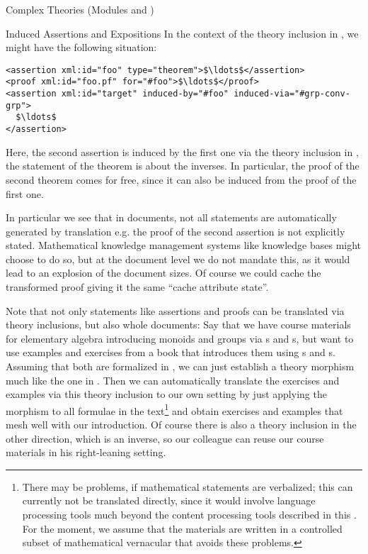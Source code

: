 \begin{tchapter}[id=complex-theories,short=Complex Theories]{Complex Theories (Modules
    {} and {})}
\begin{tsection}[id=induced-assertions,short=Induced Assertions]{Induced Assertions and Expositions}
  In the context of the theory inclusion in {}, we
  might have the following situation:
\begin{lstlisting}[label=lst:assertion-translation,mathescape,
  caption={Translating a Statement via a Theory Inclusion},
  index={translated-from,translated-via}]
<assertion xml:id="foo" type="theorem">$\ldots$</assertion>
<proof xml:id="foo.pf" for="#foo">$\ldots$</proof>
<assertion xml:id="target" induced-by="#foo" induced-via="#grp-conv-grp"> 
  $\ldots$
</assertion>
\end{lstlisting}
Here, the second assertion is induced by the first one via the theory inclusion in
{}, the statement of the theorem is about the inverses.  In
particular, the proof of the second theorem comes for free, since it can also be induced
from the proof of the first one.

In particular we see that in {\omdoc} documents, not all statements are automatically
generated by translation e.g. the proof of the second assertion is not explicitly stated.
Mathematical knowledge management systems like knowledge bases might choose to do so, but
at the document level we do not mandate this, as it would lead to an explosion of the
document sizes. Of course we could cache the transformed proof giving it the same ``cache
attribute state''.

Note that not only statements like assertions and proofs can be translated via theory
inclusions, but also whole documents: Say that we have course materials for elementary
algebra introducing monoids and groups via {s} and
{s}, but want to use examples and exercises from a book that
introduces them using {s} and {s}. Assuming
that both are formalized in {\omdoc}, we can just establish a theory morphism much like
the one in {}. Then we can automatically translate the
exercises and examples via this theory inclusion to our own setting by just applying the
morphism to all formulae in the text\footnote{There may be problems, if mathematical
  statements are verbalized; this can currently not be translated directly, since it would
  involve language processing tools much beyond the content processing tools described in
  this {\report}. For the moment, we assume that the materials are written in a controlled
  subset of mathematical vernacular that avoids these problems.}  and obtain exercises and
examples that mesh well with our introduction. Of course there is also a theory inclusion
in the other direction, which is an inverse, so our colleague can reuse our course
materials in his right-leaning setting.


\end{tsection}
\end{tchapter}
